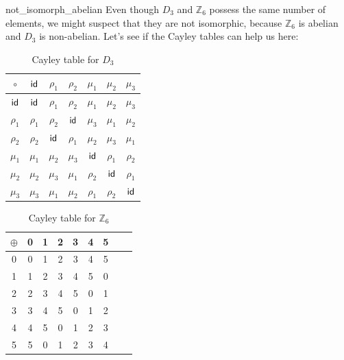 
\begin{example}{not_isomorph_abelian}
Even though $D_3$ and ${\mathbb Z}_6$ possess the same number of elements, we might suspect that they are not isomorphic, because ${\mathbb Z}_6$ is abelian and $D_3$ is non-abelian.  Let's see if the  Cayley tables can help us here:

\begin{table}[H]
{\small
\begin{center}
\begin{tabular}{c|cccccc}
$\circ$  & $\sf{id}$     & $\rho_1$ & $\rho_2$ & $\mu_1$ & $\mu_2$ & $\mu_3$ \\
\hline
$\sf{id}$     & $\sf{id}$     & $\rho_1$ & $\rho_2$ & $\mu_1$ & $\mu_2$ & $\mu_3$ \\
$\rho_1$ & $\rho_1$ & $\rho_2$ & $\sf{id}$     & $\mu_3$ & $\mu_1$ & $\mu_2$ \\
$\rho_2$ & $\rho_2$ & $\sf{id}$     & $\rho_1$ & $\mu_2$ & $\mu_3$ & $\mu_1$ \\
$\mu_1$  & $\mu_1$  & $\mu_2$  & $\mu_3$  & $\sf{id}$    & $\rho_1$& $\rho_2$\\
$\mu_2$  & $\mu_2$  & $\mu_3$  & $\mu_1$  & $\rho_2$& $\sf{id}$    & $\rho_1$\\
$\mu_3$  & $\mu_3$  & $\mu_1$  & $\mu_2$  & $\rho_1$& $\rho_2$& $\sf{id}$
\end{tabular}
\end{center}
}
\caption{Cayley table for $D_3$}
\label{D3_table}
\end{table}

\begin{table}[H]
\caption{Cayley table for ${\mathbb Z}_6$}
\label{Z6_add_table}
{\small
\begin{center}
\begin{tabular}{c|cccccccc}
$\oplus$ & 0 & 1 & 2 & 3 & 4 & 5  \\
\hline
0        & 0 & 1 & 2 & 3 & 4 & 5  \\
1       & 1 & 2 & 3 & 4 & 5 & 0  \\
2       & 2 & 3 & 4 & 5 & 0 & 1\\
3       & 3 & 4 & 5 & 0 & 1 & 2 \\
4       & 4 & 5 & 0 & 1 & 2 & 3 \\
5       & 5 & 0 & 1 & 2 & 3 & 4 \\

\end{tabular}
\end{center}
}
\end{table}


\end{example}

